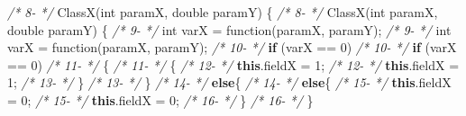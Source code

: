 \documentclass[
]{article}
\newenvironment{Shaded}{\begin{snugshade}}{\end{snugshade}}
\newcommand{\CommentTok}[1]{\textcolor[rgb]{0.56,0.35,0.01}{\textit{#1}}}
\newcommand{\DataTypeTok}[1]{\textcolor[rgb]{0.13,0.29,0.53}{#1}}
\newcommand{\DecValTok}[1]{\textcolor[rgb]{0.00,0.00,0.81}{#1}}
\newcommand{\FunctionTok}[1]{\textcolor[rgb]{0.00,0.00,0.00}{#1}}
\newcommand{\KeywordTok}[1]{\textcolor[rgb]{0.13,0.29,0.53}{\textbf{#1}}}
\newcommand{\NormalTok}[1]{#1}
\begin{document}
\begin{landscape}
\begin{Shaded}
\begin{Highlighting}[]
\CommentTok{/*  8-                 */}    \FunctionTok{ClassX}\NormalTok{(}\DataTypeTok{int}\NormalTok{ paramX, }\DataTypeTok{double}\NormalTok{ paramY) \{                                }\CommentTok{/*  8-                 */}    \FunctionTok{ClassX}\NormalTok{(}\DataTypeTok{int}\NormalTok{ paramX, }\DataTypeTok{double}\NormalTok{ paramY) \{                                }
\CommentTok{/*  9-                 */}        \DataTypeTok{int}\NormalTok{ varX = }\FunctionTok{function}\NormalTok{(paramX, paramY);                          }\CommentTok{/*  9-                 */}        \DataTypeTok{int}\NormalTok{ varX = }\FunctionTok{function}\NormalTok{(paramX, paramY);                           }
\CommentTok{/* 10-                 */}        \KeywordTok{if}\NormalTok{ (varX == }\DecValTok{0}\NormalTok{)                                         }\CommentTok{/* 10-                 */}        \KeywordTok{if}\NormalTok{ (varX == }\DecValTok{0}\NormalTok{)                                         }
\CommentTok{/* 11-                 */}\NormalTok{        \{                                                      }\CommentTok{/* 11-                 */}\NormalTok{        \{                                                      }
\CommentTok{/* 12-                 */}            \KeywordTok{this}\NormalTok{.}\FunctionTok{fieldX}\NormalTok{ = }\DecValTok{1}\NormalTok{;                                   }\CommentTok{/* 12-                 */}            \KeywordTok{this}\NormalTok{.}\FunctionTok{fieldX}\NormalTok{ = }\DecValTok{1}\NormalTok{;                                   }
\CommentTok{/* 13-                 */}\NormalTok{        \}                                                                }\CommentTok{/* 13-                 */}\NormalTok{        \}                                                                  }
\CommentTok{/* 14-                 */}        \KeywordTok{else}\NormalTok{\{                                                  }\CommentTok{/* 14-                 */}        \KeywordTok{else}\NormalTok{\{                                                  }
\CommentTok{/* 15-                 */}            \KeywordTok{this}\NormalTok{.}\FunctionTok{fieldX}\NormalTok{ = }\DecValTok{0}\NormalTok{;                                   }\CommentTok{/* 15-                 */}            \KeywordTok{this}\NormalTok{.}\FunctionTok{fieldX}\NormalTok{ = }\DecValTok{0}\NormalTok{;                                   }
\CommentTok{/* 16-                 */}\NormalTok{        \}                                                      }\CommentTok{/* 16-                 */}\NormalTok{        \}                                                      }

\end{Highlighting}
\end{Shaded}
\end{landscape}
\end{document}
